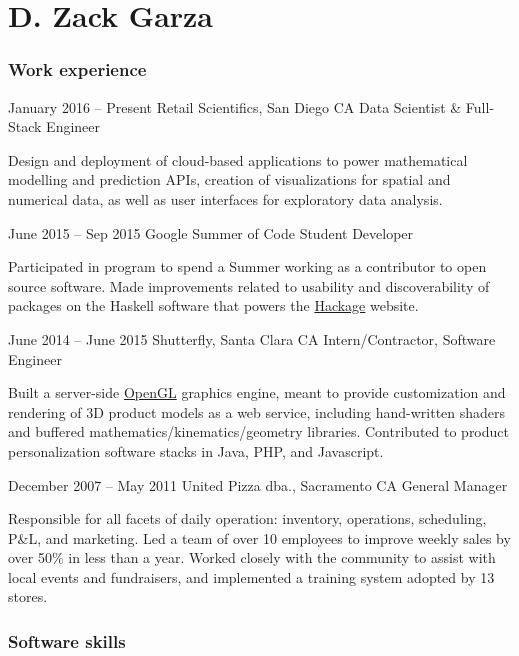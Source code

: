 \documentclass{tccv}
\begin{document}
\part{D. Zack Garza}

\section{Work experience}

\begin{eventlist}

\item{January 2016 -- Present}
     {Retail Scientifics, San Diego CA}
     {Data Scientist \& Full-Stack Engineer}

     Design and deployment of cloud-based applications to power mathematical modelling and prediction APIs, creation of visualizations for spatial and numerical data, as well as user interfaces for exploratory data analysis.

\item{June 2015 -- Sep 2015}
     {Google Summer of Code}
     {Student Developer}

     Participated in program to spend a Summer working as a contributor to open source software. Made improvements related to usability and discoverability of packages on the Haskell software that powers the \href{https://hackage.haskell.org/}{Hackage} website.

\item{June 2014 -- June 2015}
     {Shutterfly, Santa Clara CA}
     {Intern/Contractor, Software Engineer}

    Built a server-side \href{https://www.opengl.org/}{OpenGL} graphics engine, meant to provide customization and rendering of 3D product models as a web service, including hand-written shaders and buffered mathematics/kinematics/geometry libraries. Contributed to product personalization software stacks in Java, PHP, and Javascript.

\item{December 2007 -- May 2011}
     {United Pizza dba., Sacramento CA}
     {General Manager}

    Responsible for all facets of daily operation: inventory, operations, scheduling, P\&L, and marketing. Led a team of over 10 employees to improve weekly sales by over 50\% in less than a year. Worked closely with the community to assist with local events and fundraisers, and implemented a training system adopted by 13 stores.

\section{Software skills}


\end{eventlist}
\end{document}
